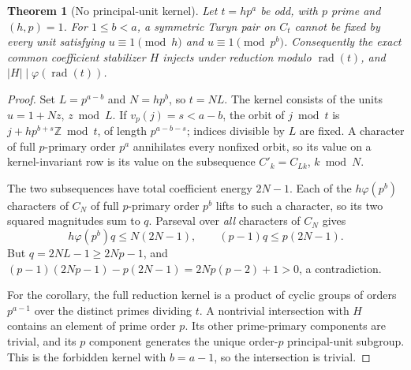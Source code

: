 \documentclass[11pt]{article}
\newtheorem{theorem}{Theorem}[section]
\theoremstyle{definition}
\theoremstyle{remark}
\begin{document}
\begin{theorem}[No principal-unit kernel]\label{thm:kernel}
Let $t=hp^a$ be odd, with $p$ prime and $(h,p)=1$. For $1\le b<a$, a
symmetric Turyn pair on $C_t$ cannot be fixed by every unit satisfying
$u\equiv1\pmod h$ and $u\equiv1\pmod{p^b}$.
Consequently the exact common coefficient stabilizer $H$ injects under
reduction modulo $\operatorname{rad}(t)$, and
$|H|\mid\varphi(\operatorname{rad}(t))$.
\end{theorem}
\begin{proof}
Set $L=p^{a-b}$ and $N=hp^b$, so $t=NL$. The kernel consists of the units
$u=1+Nz$, $z\bmod L$. If $v_p(j)=s<a-b$, the orbit of $j\bmod t$ is
$j+hp^{b+s}\mathbb Z\bmod t$, of length $p^{a-b-s}$; indices divisible
by $L$ are fixed. A character of full $p$-primary order $p^a$ annihilates
every nonfixed orbit, so its value on a kernel-invariant row is its value
on the subsequence $C'_k=C_{Lk}$, $k\bmod N$.

The two subsequences have total coefficient energy $2N-1$. Each of the
$h\varphi(p^b)$ characters of $C_N$ of full $p$-primary order $p^b$
lifts to such a character, so its two squared magnitudes sum to $q$.
Parseval over \emph{all} characters of $C_N$ gives
\[
 h\varphi(p^b)q\le N(2N-1),\qquad (p-1)q\le p(2N-1).
\]
But $q=2NL-1\ge2Np-1$, and
$(p-1)(2Np-1)-p(2N-1)=2Np(p-2)+1>0$, a contradiction.

For the corollary, the full reduction kernel is a product of cyclic groups
of orders $p^{a-1}$ over the distinct primes dividing $t$. A nontrivial
intersection with $H$ contains an element of prime order $p$. Its other
prime-primary components are trivial, and its $p$ component generates the
unique order-$p$ principal-unit subgroup. This is the forbidden kernel
with $b=a-1$, so the intersection is trivial.
\end{proof}
\end{document}
